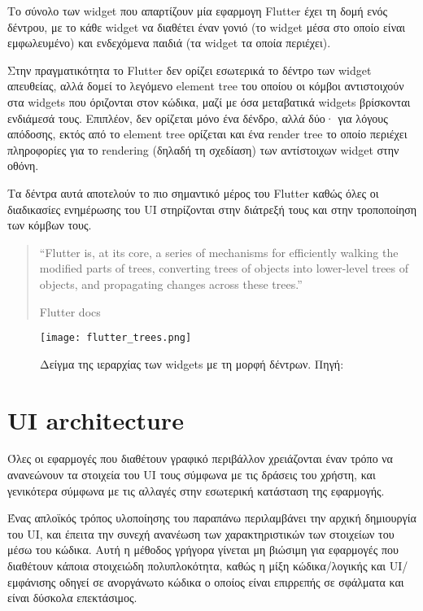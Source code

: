 \documentclass[../thesis.tex]{subfiles}
\begin{document}
\bigskip

Το σύνολο των widget που απαρτίζουν μία εφαρμογη Flutter έχει τη δομή ενός δέντρου, με το κάθε widget να διαθέτει έναν γονιό (το widget μέσα στο οποίο είναι εμφωλευμένο) και ενδεχόμενα παιδιά (τα widget τα οποία περιέχει).

Στην πραγματικότητα το Flutter δεν ορίζει εσωτερικά το δέντρο των widget απευθείας, αλλά δομεί το λεγόμενο element tree του οποίου οι κόμβοι αντιστοιχούν στα widgets που όριζονται στον κώδικα, μαζί με όσα μεταβατικά widgets βρίσκονται ενδιάμεσά τους.
Επιπλέον, δεν ορίζεται μόνο ένα δένδρο, αλλά δύο· για λόγους απόδοσης, εκτός από το element tree ορίζεται και ένα render tree το οποίο περιέχει πληροφορίες για το rendering (δηλαδή τη σχεδίαση) των αντίστοιχων widget στην οθόνη.

Τα δέντρα αυτά αποτελούν το πιο σημαντικό μέρος του Flutter καθώς όλες οι διαδικασίες ενημέρωσης του UI στηρίζονται στην διάτρεξή τους και στην τροποποίηση των κόμβων τους.

\begin{quote}
    \nobreak
    \singlespacing
    \small
    ``Flutter is, at its core, a series of mechanisms for efficiently walking the modified parts of trees, converting trees of objects into lower-level trees of objects, and propagating changes across these trees.''

    \hfill{Flutter docs\cite{flutter_architecture}}
\end{quote}

\begin{figure}
    \texttt{[image: flutter\_trees.png]}
    \centering
    \caption{Δείγμα της ιεραρχίας των widgets με τη μορφή δέντρων. Πηγή: \cite{flutter_architecture}}
\end{figure}

\section{UI architecture}

Όλες οι εφαρμογές που διαθέτουν γραφικό περιβάλλον χρειάζονται έναν τρόπο να ανανεώνουν τα στοιχεία του UI τους σύμφωνα με τις δράσεις του χρήστη, και γενικότερα σύμφωνα με τις αλλαγές στην εσωτερική κατάσταση της εφαρμογής.

Ένας απλοϊκός τρόπος υλοποίησης του παραπάνω περιλαμβάνει την αρχική δημιουργία του UI, και έπειτα την συνεχή ανανέωση των χαρακτηριστικών των στοιχείων του μέσω του κώδικα.
Αυτή η μέθοδος γρήγορα γίνεται μη βιώσιμη για εφαρμογές που διαθέτουν κάποια στοιχειώδη πολυπλοκότητα, καθώς η μίξη κώδικα/λογικής και UI/εμφάνισης οδηγεί σε ανοργάνωτο κώδικα ο οποίος είναι επιρρεπής σε σφάλματα και είναι δύσκολα επεκτάσιμος.
\end{document}
